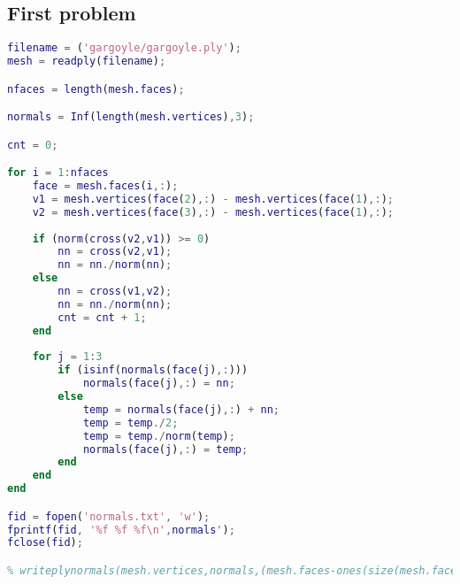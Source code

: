 \documentclass{article}
\begin{document}
\subsection{First problem}
\begin{lstlisting}[language=Matlab]
filename = ('gargoyle/gargoyle.ply');
mesh = readply(filename);

nfaces = length(mesh.faces);

normals = Inf(length(mesh.vertices),3);

cnt = 0;

for i = 1:nfaces
    face = mesh.faces(i,:);
    v1 = mesh.vertices(face(2),:) - mesh.vertices(face(1),:);
    v2 = mesh.vertices(face(3),:) - mesh.vertices(face(1),:);
    
    if (norm(cross(v2,v1)) >= 0)
        nn = cross(v2,v1);
        nn = nn./norm(nn);
    else
        nn = cross(v1,v2);
        nn = nn./norm(nn);
        cnt = cnt + 1;
    end
    
    for j = 1:3
        if (isinf(normals(face(j),:)))
            normals(face(j),:) = nn;
        else
            temp = normals(face(j),:) + nn;
            temp = temp./2;
            temp = temp./norm(temp);
            normals(face(j),:) = temp;
        end
    end
end

fid = fopen('normals.txt', 'w');
fprintf(fid, '%f %f %f\n',normals');
fclose(fid);

% writeplynormals(mesh.vertices,normals,(mesh.faces-ones(size(mesh.faces))),'test3.ply');

\end{lstlisting}

\vspace{1.5pc}
\end{document}
